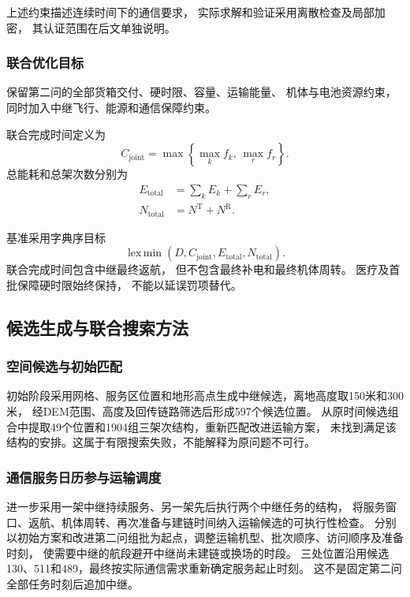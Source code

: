 \documentclass[bwprint]{gmcmthesis}
\begin{document}
上述约束描述连续时间下的通信要求，
实际求解和验证采用离散检查及局部加密，
其认证范围在后文单独说明。

\subsubsection{联合优化目标}

保留第二问的全部货箱交付、硬时限、容量、运输能量、
机体与电池资源约束，
同时加入中继飞行、能源和通信保障约束。

联合完成时间定义为
\begin{equation}
    C_{\mathrm{joint}}
    =
    \max\left\{
    \max_k f_k,\,
    \max_r f_r
    \right\}.
\end{equation}
总能耗和总架次数分别为
\begin{align}
    E_{\mathrm{total}}
    &=
    \sum_k E_k+\sum_r E_r,\\
    N_{\mathrm{total}}
    &=
    N^{\mathrm{T}}+N^{\mathrm{R}}.
\end{align}

基准采用字典序目标
\begin{equation}
    \operatorname{lex\,min}
    \left(
    D,C_{\mathrm{joint}},
    E_{\mathrm{total}},N_{\mathrm{total}}
    \right).
\end{equation}
联合完成时间包含中继最终返航，
但不包含最终补电和最终机体周转。
医疗及首批保障硬时限始终保持，
不能以延误罚项替代。

\subsection{候选生成与联合搜索方法}
\subsubsection{空间候选与初始匹配}
初始阶段采用网格、服务区位置和地形高点生成中继候选，离地高度取150米和300米，
经DEM范围、高度及回传链路筛选后形成597个候选位置。
从原时间候选组合中提取49个位置和1904组三架次结构，重新匹配改进运输方案，
未找到满足该结构的安排。这属于有限搜索失败，不能解释为原问题不可行。

\subsubsection{通信服务日历参与运输调度}
进一步采用一架中继持续服务、另一架先后执行两个中继任务的结构，
将服务窗口、返航、机体周转、再次准备与建链时间纳入运输候选的可执行性检查。
分别以初始方案和改进第二问组批为起点，调整运输机型、批次顺序、访问顺序及准备时刻，
使需要中继的航段避开中继尚未建链或换场的时段。
三处位置沿用候选130、511和489，最终按实际通信需求重新确定服务起止时刻。
这不是固定第二问全部任务时刻后追加中继。
\end{document}
